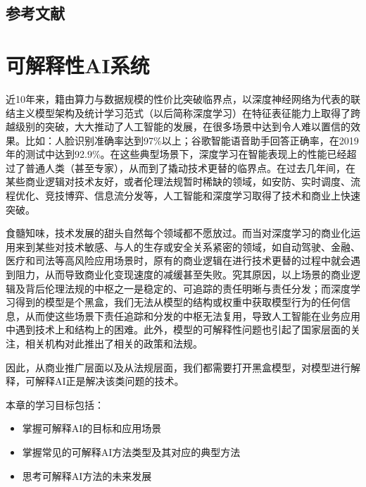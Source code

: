 \documentclass[letterpaper,10pt,english]{sphinxmanual}
\begin{document}
\section{参考文献}
\label{\detokenize{chapter_reinforcement_learning/summary:id2}}
\sphinxAtStartPar



\chapter{可解释性AI系统}
\label{\detokenize{chapter_explainable_AI/index:ai}}\label{\detokenize{chapter_explainable_AI/index::doc}}
\sphinxAtStartPar
近10年来，籍由算力与数据规模的性价比突破临界点，以深度神经网络为代表的联结主义模型架构及统计学习范式（以后简称深度学习）在特征表征能力上取得了跨越级别的突破，大大推动了人工智能的发展，在很多场景中达到令人难以置信的效果。比如：人脸识别准确率达到97\%以上；谷歌智能语音助手回答正确率，在2019年的测试中达到92.9\%。在这些典型场景下，深度学习在智能表现上的性能已经超过了普通人类（甚至专家），从而到了撬动技术更替的临界点。在过去几年间，在某些商业逻辑对技术友好，或者伦理法规暂时稀缺的领域，如安防、实时调度、流程优化、竞技博弈、信息流分发等，人工智能和深度学习取得了技术和商业上快速突破。

\sphinxAtStartPar
食髓知味，技术发展的甜头自然每个领域都不愿放过。而当对深度学习的商业化运用来到某些对技术敏感、与人的生存或安全关系紧密的领域，如自动驾驶、金融、医疗和司法等高风险应用场景时，原有的商业逻辑在进行技术更替的过程中就会遇到阻力，从而导致商业化变现速度的减缓甚至失败。究其原因，以上场景的商业逻辑及背后伦理法规的中枢之一是稳定的、可追踪的责任明晰与责任分发；而深度学习得到的模型是个黑盒，我们无法从模型的结构或权重中获取模型行为的任何信息，从而使这些场景下责任追踪和分发的中枢无法复用，导致人工智能在业务应用中遇到技术上和结构上的困难。此外，模型的可解释性问题也引起了国家层面的关注，相关机构对此推出了相关的政策和法规。

\sphinxAtStartPar
因此，从商业推广层面以及从法规层面，我们都需要打开黑盒模型，对模型进行解释，可解释AI正是解决该类问题的技术。

\sphinxAtStartPar
本章的学习目标包括：
\begin{itemize}
\item {} 
\sphinxAtStartPar
掌握可解释AI的目标和应用场景

\item {} 
\sphinxAtStartPar
掌握常见的可解释AI方法类型及其对应的典型方法

\item {} 
\sphinxAtStartPar
思考可解释AI方法的未来发展

\end{itemize}
\end{document}
